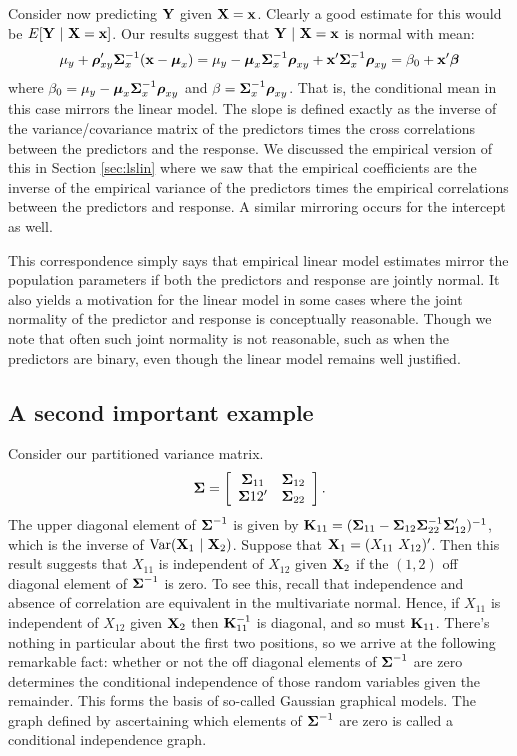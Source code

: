 Consider now predicting $\mathbf{Y}$ given $\mathbf{X} = \mathbf{x}$. Clearly a good estimate
for this would be $E[\mathbf{Y} ~|~ \mathbf{X} = \mathbf{x}]$. Our results
suggest that $\mathbf{Y} ~|~ \mathbf{X} = \mathbf{x}$ is normal with mean:
$$
\mu_y + \boldsymbol{\rho}_{xy}' \boldsymbol{\Sigma}_x^{-1} (\mathbf{x} - \boldsymbol{\mu}_x)
= \mu_y - \boldsymbol{\mu}_x \boldsymbol{\Sigma}_x^{-1}\boldsymbol{\rho}_{xy} + \mathbf{x}' \boldsymbol{\Sigma}_x^{-1} \boldsymbol{\rho}_{xy}
= \beta_0 + \mathbf{x}' \boldsymbol{\beta}
$$
where $\beta_0 = \mu_y - \boldsymbol{\mu}_x \boldsymbol{\Sigma}_x^{-1}\boldsymbol{\rho}_{xy}$ and $\beta = \boldsymbol{\Sigma}_x^{-1} \boldsymbol{\rho}_{xy}$. That is, the conditional mean in this case mirrors the
linear model. The slope is defined exactly as the inverse of the variance/covariance matrix
of the predictors times the cross correlations between the predictors and the response.
We discussed the empirical version of this in Section \ref{sec:lslin} where we saw that the empirical coefficients are the inverse of the empirical variance of the predictors times the empirical correlations between the predictors and response.  A similar mirroring occurs for the intercept as well. 

This correspondence simply says that empirical linear model estimates mirror the population parameters if both the predictors and response are jointly normal. It also yields
a motivation for the linear model in some cases where the joint normality of the
predictor and response is conceptually reasonable. Though we note that often such
joint normality is not reasonable, such as when the predictors are binary, even
though the linear model remains well justified. 

\subsection{A second important example}
Consider our partitioned variance matrix. 
$$
\boldsymbol{\Sigma} = \left[
\begin{array}{cc}
\boldsymbol{\Sigma}_{11} & \boldsymbol{\Sigma}_{12} \\
\boldsymbol{\Sigma}{12}' & \boldsymbol{\Sigma}_{22}
\end{array}
\right].
$$
The upper diagonal element of $\boldsymbol{\Sigma}^{-1}$ is given by $\mathbf{K}_{11} = (\boldsymbol{\Sigma}_{11} - \boldsymbol{\Sigma}_{12} \boldsymbol{\Sigma}_{22}^{-1} \boldsymbol{\Sigma}_{12}')^{-1}$, which is the inverse of $\mbox{Var}(\mathbf{X}_1 ~|~ \mathbf{X}_2)$. Suppose that $\mathbf{X}_1 = (X_{11} ~ X_{12})'$. Then this result suggests that
$X_{11}$ is independent of $X_{12}$ given $\mathbf{X}_2$ if the $(1,2)$ off diagonal element
of $\boldsymbol{\Sigma}^{-1}$ is zero. To see this, recall that independence and absence of correlation are
equivalent in the multivariate normal. Hence, if $X_{11}$ is independent of $X_{12}$ given $\mathbf{X}_2$ then $\mathbf{K}_{11}^{-1}$ is diagonal, and so must $\mathbf{K}_{11}$.
There's nothing in particular about the
first two positions, so we arrive at the following remarkable fact: whether or not
the off diagonal elements of $\boldsymbol{\Sigma}^{-1}$ are zero determines the conditional
independence of those random variables given the remainder. This forms the
basis of so-called Gaussian graphical models. The graph defined by ascertaining
which elements of $\boldsymbol{\Sigma}^{-1}$ are zero is called a conditional independence graph.


